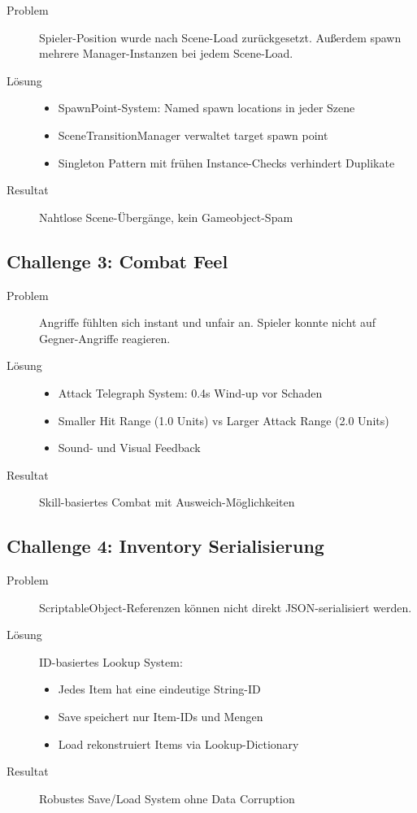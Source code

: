 \documentclass[
  a4paper,
  11pt,
  ngerman,
  parskip=half,
  bibliography=totoc,
  listof=totoc
]{scrreprt}
\begin{document}
\begin{description}
    \item[Problem] Spieler-Position wurde nach Scene-Load zurückgesetzt. Außerdem spawn mehrere Manager-Instanzen bei jedem Scene-Load.
    \item[Lösung]
    \begin{itemize}
        \item SpawnPoint-System: Named spawn locations in jeder Szene
        \item SceneTransitionManager verwaltet target spawn point
        \item Singleton Pattern mit frühen Instance-Checks verhindert Duplikate
    \end{itemize}
    \item[Resultat] Nahtlose Scene-Übergänge, kein Gameobject-Spam
\end{description}

\subsection{Challenge 3: Combat Feel}

\begin{description}
    \item[Problem] Angriffe fühlten sich instant und unfair an. Spieler konnte nicht auf Gegner-Angriffe reagieren.
    \item[Lösung]
    \begin{itemize}
        \item Attack Telegraph System: 0.4s Wind-up vor Schaden
        \item Smaller Hit Range (1.0 Units) vs Larger Attack Range (2.0 Units)
        \item Sound- und Visual Feedback
    \end{itemize}
    \item[Resultat] Skill-basiertes Combat mit Ausweich-Möglichkeiten
\end{description}

\subsection{Challenge 4: Inventory Serialisierung}

\begin{description}
    \item[Problem] ScriptableObject-Referenzen können nicht direkt JSON-serialisiert werden.
    \item[Lösung] ID-basiertes Lookup System:
    \begin{itemize}
        \item Jedes Item hat eine eindeutige String-ID
        \item Save speichert nur Item-IDs und Mengen
        \item Load rekonstruiert Items via Lookup-Dictionary
    \end{itemize}
    \item[Resultat] Robustes Save/Load System ohne Data Corruption
\end{description}
\end{document}
